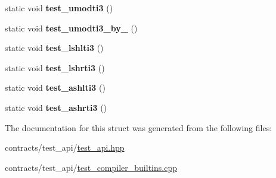 \begin{DoxyCompactItemize}
static void {\bfseries test\+\_\+umodti3} ()
\item 
\mbox{\label{structtest__compiler__builtins_a9af2929c72eac9d34c6c653237298811}} 
static void {\bfseries test\+\_\+umodti3\+\_\+by\+\_} ()
\item 
\mbox{\label{structtest__compiler__builtins_af5e3bab6b665ab62aadb290cc64b0abd}} 
static void {\bfseries test\+\_\+lshlti3} ()
\item 
\mbox{\label{structtest__compiler__builtins_afa80b4941e464cd7a9acc2e6cb998ae2}} 
static void {\bfseries test\+\_\+lshrti3} ()
\item 
\mbox{\label{structtest__compiler__builtins_a659fe4bede1f45b5956172cbd4d06f49}} 
static void {\bfseries test\+\_\+ashlti3} ()
\item 
\mbox{\label{structtest__compiler__builtins_aa7a2a4283f5beaf1855a3bc21bf594e6}} 
static void {\bfseries test\+\_\+ashrti3} ()
\end{DoxyCompactItemize}


The documentation for this struct was generated from the following files\+:\begin{DoxyCompactItemize}
\item 
contracts/test\+\_\+api/\mbox{\hyperlink{test__api_8hpp}{test\+\_\+api.\+hpp}}\item 
contracts/test\+\_\+api/\mbox{\hyperlink{test__compiler__builtins_8cpp}{test\+\_\+compiler\+\_\+builtins.\+cpp}}\end{DoxyCompactItemize}
